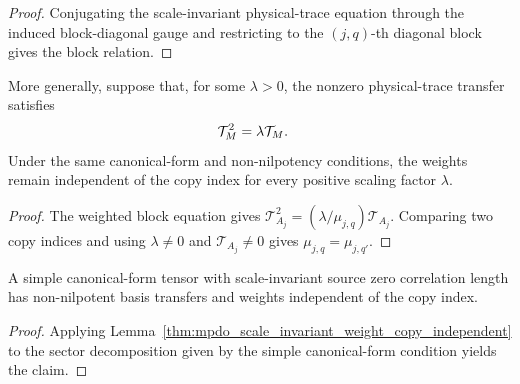 \begin{proof}\leanok
    Conjugating the scale-invariant physical-trace equation through the induced
    block-diagonal gauge and restricting to the $(j,q)$-th diagonal block gives
    the block relation.
\end{proof}

\begin{lemma}
    \label{thm:mpdo_scale_invariant_weight_copy_independent}
    \leanok
    More generally, suppose that, for some $\lambda>0$, the nonzero
    physical-trace transfer satisfies
    \begin{align}
        \mathcal T_M^2 & =\lambda\mathcal T_M.
        \notag
    \end{align}
    Under the same canonical-form and non-nilpotency conditions, the weights
    remain independent of the copy index for every positive scaling factor
    $\lambda$.
\end{lemma}

\begin{proof}\leanok
    The weighted block equation gives
    $\mathcal T_{A_j}^2=(\lambda/\mu_{j,q})\mathcal T_{A_j}$.
    Comparing two copy indices and using
    $\lambda\ne0$ and $\mathcal T_{A_j}\ne0$ gives
    $\mu_{j,q}=\mu_{j,q'}$.
\end{proof}

\begin{corollary}
    \label{cor:mpdo_simple_scale_invariant_zcl_weight_copy_independent}
    \leanok
    A simple canonical-form tensor with scale-invariant source zero correlation
    length has non-nilpotent basis transfers and weights independent of the
    copy index.
\end{corollary}

\begin{proof}\leanok
    Applying Lemma~\ref{thm:mpdo_scale_invariant_weight_copy_independent} to the
    sector decomposition given by the simple canonical-form condition yields the
    claim.
\end{proof}

